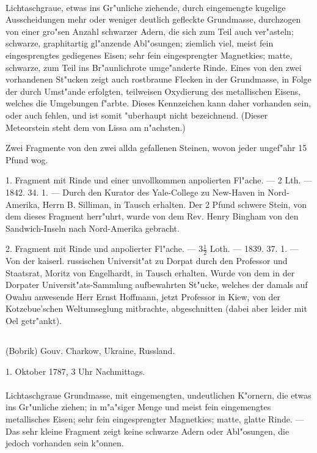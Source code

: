 \documentclass[a4paper, 11pt, oneside, polutonikogreek, german]{article}
\begin{document}
\paragraph{}
Lichtaschgraue, etwas ins Gr"unliche ziehende, durch eingemengte kugelige Ausscheidungen mehr oder weniger deutlich gefleckte Grundmasse, durchzogen von einer gro"sen Anzahl schwarzer Adern, die sich zum Teil auch ver"asteln; schwarze, graphitartig gl"anzende Abl"osungen; ziemlich viel, meist fein eingesprengtes gediegenes Eisen; sehr fein eingesprengter Magnetkies; matte, schwarze, zum Teil ins Br"aunlichrote umge"anderte Rinde. Eines von den zwei vorhandenen St"ucken zeigt auch rostbraune Flecken in der Grundmasse, in Folge der durch Umst"ande erfolgten, teilweisen Oxydierung des metallischen Eisens, welches die Umgebungen f"arbte. Dieses Kennzeichen kann daher vorhanden sein, oder auch fehlen, und ist somit "uberhaupt nicht bezeichnend. (Dieser Meteorstein steht dem von Lissa am n"achsten.)

Zwei Fragmente von den zwei allda gefallenen Steinen, wovon jeder ungef"ahr 15 Pfund wog.

1. Fragment mit Rinde und einer unvollkommen anpolierten Fl"ache. --- 2 Lth. --- 1842. 34. 1. --- Durch den Kurator des Yale-College zu New-Haven in Nord-Amerika, Herrn B. Silliman, in Tausch erhalten. Der 2 Pfund schwere Stein, von dem dieses Fragment herr"uhrt, wurde von dem Rev. Henry Bingham von den Sandwich-Inseln nach Nord-Amerika gebracht.

2. Fragment mit Rinde und anpolierter Fl"ache. --- $3\frac{1}{2}$ Loth. --- 1839. 37. 1. --- Von der kaiserl. russischen Universit"at zu Dorpat durch den Professor und Staatsrat, Moritz von Engelhardt, in Tausch erhalten. Wurde von dem in der Dorpater Universit"ats-Sammlung aufbewahrten St"ucke, welches der damals auf Owahu anwesende Herr Ernst Hoffmann, jetzt Professor in Kiew, von der Kotzebue'schen Weltumseglung mitbrachte, abgeschnitten (dabei aber leider mit Oel getr"ankt).
\subsection{}
\begin{center}

(Bobrik) Gouv. Charkow, Ukraine, Russland.

1. Oktober 1787, 3 Uhr Nachmittags.
\end{center}
\paragraph{}
Lichtaschgraue Grundmasse, mit eingemengten, undeutlichen K"ornern, die etwas ins Gr"unliche ziehen; in m"a"siger Menge und meist fein eingemengtes metallisches Eisen; sehr fein eingesprengter Magnetkies; matte, glatte Rinde. --- Das sehr kleine Fragment zeigt keine schwarze Adern oder Abl"osungen, die jedoch vorhanden sein k"onnen.
\end{document}

